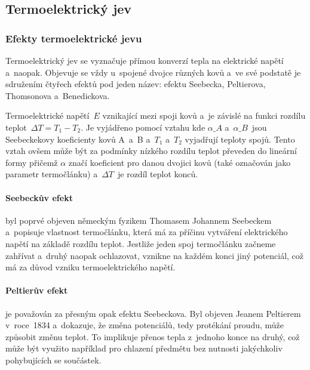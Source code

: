 \subsection{Termoelektrický jev}
\subsubsection{Efekty termoelektrické jevu}
Termoelektrický jev se vyznačuje přímou konverzí tepla na elektrické napětí
a~naopak. Objevuje se vždy u~spojené dvojce různých kovů a~ve své podstatě je
sdružením čtyřech efektů pod jeden název: efektu Seebecka, Peltierova,
Thomsonova a~Benedickova.~\cite{praktikum,diplomka}

Termoelektrické napětí~$E$ vznikající mezi spoji kovů a~je závislé na funkci
rozdílu teplot~$\Delta T = T_1 - T_2$. Je vyjádřeno pomocí vztahu
kde $\alpha\_A$ a~$\alpha\_B$~jsou  Seebeckekovy koeficienty kovů A~a~B a~$T_1$
a~$T_2$ vyjadřují teploty spojů.  Tento vztah ovšem může být za podmínky
nízkého rozdílu teplot převeden do lineární formy
přičemž $\alpha$ značí koeficient pro danou dvojici kovů (také označován jako
parametr termočlánku) a~$\Delta T$~je  rozdíl teplot konců.~\cite{diplomka}

\paragraph{Seebeckův efekt} byl poprvé objeven německým fyzikem Thomasem
Johannem Seebeckem a~popisuje vlastnost termočlánku, která má za příčinu
vytváření elektrického napětí na základě rozdílu teplot. Jestliže jeden spoj
termočlánku začneme zahřívat a~druhý naopak ochlazovat, vznikne na každém konci
jiný potenciál, což má za důvod vzniku termoelektrického
napětí.~\cite{jreichl-seebeck}

\paragraph{Peltierův efekt} je považován za přesným opak efektu Seebeckova. Byl
objeven Jeanem Peltierem v~roce~1834 a~dokazuje, že změna potenciálů, tedy
protékání proudu, může způsobit změnu teplot. To implikuje přenos tepla
z~jednoho konce na druhý, což může být využito například pro chlazení předmětu
bez nutnosti jakýchkoliv pohybujících se součástek.~\cite{peltier,
jreichl-peltier}

